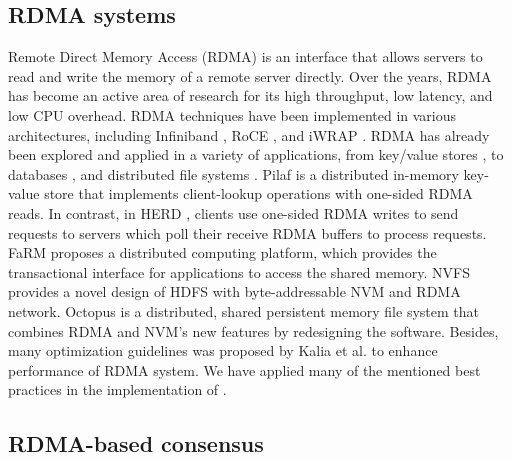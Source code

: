 \subsection{RDMA systems}
\label{sec:rwrdmasys}

Remote Direct Memory Access (RDMA) \cite{kalia2016design} is an interface that
allows servers to read and write the memory of a remote server directly. Over
the years, RDMA has become an active area of research for its high throughput,
low latency, and low CPU overhead. RDMA techniques have been implemented in
various architectures, including Infiniband \cite{pfister2001introduction}, RoCE
\cite{beck2011performance}, and iWRAP \cite{rashti200710}. RDMA has already been
explored and applied in a variety of applications, from key/value stores
\cite{FaRM, kalia2014using, mitchell2013using, wei2015fast}, to databases
\cite{binnig2015end, huang2019rdma}, and distributed file systems
\cite{islam2012high, li2009early, wu2003pvfs}. Pilaf \cite{mitchell2013using} is
a distributed in-memory key-value store that implements client-lookup operations
with one-sided RDMA reads. In contrast, in HERD \cite{kalia2014using}, clients use
one-sided RDMA writes to send requests to servers which poll their receive RDMA
buffers to process requests. FaRM \cite{FaRM} proposes a distributed computing
platform, which provides the transactional interface for applications to access
the shared memory. NVFS \cite{islam2012high} provides a novel design of HDFS
with byte-addressable NVM and RDMA network. Octopus \cite{lu2017octopus} is a
distributed, shared persistent memory file system that combines RDMA and NVM's
new features by redesigning the software. Besides, many optimization guidelines
was proposed by Kalia et al. \cite{kalia2016design} to enhance performance of
RDMA system. 
We have applied many of the mentioned best practices
in the implementation of \libname.


\subsection{RDMA-based consensus}
\label{sec:rwrdmacons}


